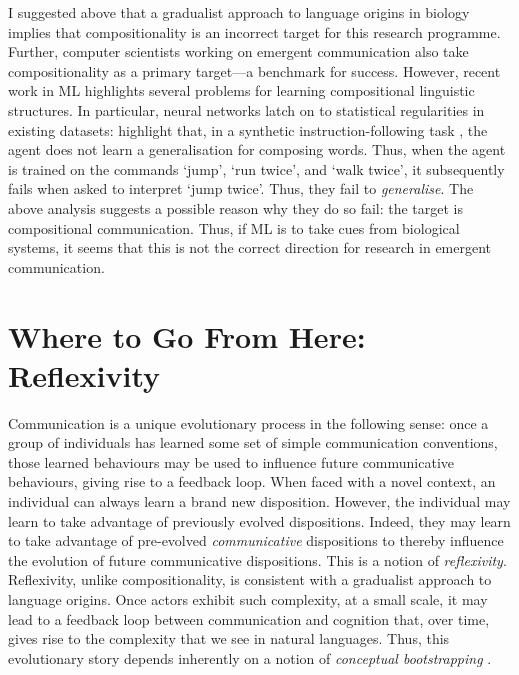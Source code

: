 \documentclass{article}
\begin{document}
I suggested above that a gradualist approach to language origins in biology implies that compositionality is an incorrect target for this research programme. Further, computer scientists working on emergent communication also take compositionality as a primary target---a benchmark for success. However, recent work in ML highlights several problems for learning compositional linguistic structures. In particular, neural networks latch on to statistical regularities in existing datasets: \citet{Bahdanau-et-al-2018} highlight that, in a synthetic instruction-following task \citep{Lake-Baroni-2017}, the agent does not learn a generalisation for composing words. Thus, when the agent is trained on the commands `jump', `run twice', and `walk twice', it subsequently fails when asked to interpret `jump twice'. Thus, they fail to {\it generalise}. %
%
%
The above analysis suggests a possible reason why they do so fail: the target is compositional communication. Thus, if ML is to take cues from biological systems, it seems that this is not the correct direction for research in emergent communication.

\section{Where to Go From Here: Reflexivity}

Communication is a unique evolutionary process in the following sense: once a group of individuals has learned some set of simple communication conventions, those learned behaviours may be used to influence future communicative behaviours, giving rise to a feedback loop. When faced with a novel context, an individual can always learn a brand new disposition. However, the individual may learn to take advantage of previously evolved dispositions. Indeed, they may learn to take advantage of pre-evolved {\it communicative} dispositions to thereby influence the evolution of future communicative dispositions. This is a notion of {\it reflexivity}. Reflexivity, unlike compositionality, is consistent with a gradualist approach to language origins. %
%
Once actors exhibit such complexity, at a small scale, it may lead to a feedback loop between communication and cognition that, over time, gives rise to the complexity that we see in natural languages. Thus, this evolutionary story depends inherently on a notion of {\it conceptual bootstrapping} \citep{Carey-2004, Carey-2009a, Carey-2009b, Carey-2011b, Carey-2011a, Carey-2014, Shea-2009, Margolis-Laurence-2008, Margolis-Laurence-2011, Piantadosi-et-al-2012, Beck-2017}.
\end{document}
